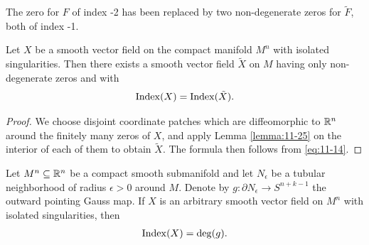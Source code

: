 The zero for $F$ of index -2 has been replaced by two non-degenerate zeros for
$\tilde{F}$, both of index -1.

\begin{corollary}\label{corollary:11-26}
  Let $X$ be a smooth vector field on the compact manifold $M^n$
with isolated singularities. Then there exists a smooth vector field $\tilde{X}$ on $M$ having
only non-degenerate zeros and with
\begin{align}\label{eq:11-14}
  \mathrm{Index}(X) = \mathrm{Index}(\tilde{X}).
\end{align}
\end{corollary}

\begin{proof}
  We choose disjoint coordinate patches which are diffeomorphic to $\mathbb{R}^n$
around the finitely many zeros of $X$, and apply Lemma \ref{lemma:11-25} on the interior of
each of them to obtain $\tilde{X}$. The formula then follows from \eqref{eq:11-14}.
\end{proof}

\begin{theorem}\label{theorem:11-27}
  Let $M^n\subseteq\mathbb{R}^n$ be a compact smooth submanifold and let $N_\epsilon$ be
a tubular neighborhood of radius $\epsilon>0$ around $M$. Denote by $g:\partial N_\epsilon\to S^{n+k-1}$
the outward pointing Gauss map. If $X$ is an arbitrary smooth vector field on $M^n$
with isolated singularities, then
\begin{align*}
  \mathrm{Index}(X) = \mathrm{deg}(g).
\end{align*}
\end{theorem}

